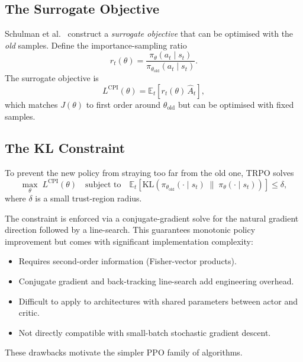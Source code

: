 \documentclass[12pt, a4paper]{article}
\theoremstyle{definition}
\theoremstyle{plain}
\theoremstyle{remark}
\newcommand{\E}{\mathbb{E}}
\newcommand{\pith}{\pi_\theta}
\newcommand{\piold}{\pi_{\theta_\mathrm{old}}}
\newcommand{\Jth}{J(\theta)}
\newcommand{\KL}{\mathrm{KL}}
\begin{document}
\subsection{The Surrogate Objective}

Schulman et al.\ \cite{schulman2015trpo} construct a \emph{surrogate objective} that can be optimised
with the \emph{old} samples.  Define the importance-sampling ratio
\begin{equation}
  r_t(\theta) = \frac{\pith(a_t \mid s_t)}{\piold(a_t \mid s_t)}.
\end{equation}
The surrogate objective is
\begin{equation}
  L^{\mathrm{CPI}}(\theta)
    = \E_t\!\left[r_t(\theta)\, \hat{A}_t\right],
\end{equation}
which matches $\Jth$ to first order around $\theta_\mathrm{old}$ but can be
optimised with fixed samples.

\subsection{The KL Constraint}

To prevent the new policy from straying too far from the old one, TRPO solves
\begin{equation}
  \max_\theta\; L^{\mathrm{CPI}}(\theta)
  \quad \text{subject to} \quad
  \E_t\!\left[\KL\!\left(\piold(\cdot \mid s_t) \;\|\; \pith(\cdot \mid s_t)\right)\right]
    \leq \delta,
  \label{eq:trpo}
\end{equation}
where $\delta$ is a small trust-region radius.

The constraint is enforced via a conjugate-gradient solve for the natural gradient
direction followed by a line-search.  This guarantees monotonic policy improvement but
comes with significant implementation complexity:
\begin{itemize}
  \item Requires second-order information (Fisher-vector products).
  \item Conjugate gradient and back-tracking line-search add engineering overhead.
  \item Difficult to apply to architectures with shared parameters between actor and
        critic.
  \item Not directly compatible with small-batch stochastic gradient descent.
\end{itemize}
These drawbacks motivate the simpler PPO family of algorithms.

\end{document}
